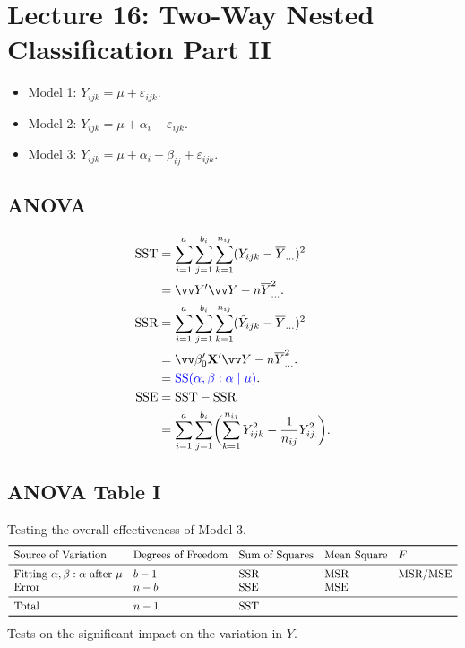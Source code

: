 \section{Lecture 16: Two-Way Nested Classification Part II}
\begin{itemize}
    \item Model 1: $ Y_{ijk}=\mu+\varepsilon_{ijk} $.
    \item Model 2: $ Y_{ijk}=\mu+\alpha_i+\varepsilon_{ijk} $.
    \item Model 3: $ Y_{ijk}=\mu+\alpha_i+\beta_{ij}+\varepsilon_{ijk} $.
\end{itemize}
\subsection*{ANOVA}
\begin{align*}
    \SST
     & =\sum_{i=1}^{a}\sum_{j=1}^{b_i}\sum_{k=1}^{n_{ij}}(Y_{ijk}-\bar{Y}_{...})^2                          \\
     & =\Vector{Y}'\Vector{Y}-n\bar{Y}_{...}^2.                                                             \\
    \SSR
     & =\sum_{i=1}^{a}\sum_{j=1}^{b_i}\sum_{k=1}^{n_{ij}}(\hat{Y}_{ijk}-\bar{Y}_{...})^2                    \\
     & =\Vector{\beta}_0'\Matrix{X}'\Vector{Y}-n\bar{Y}_{...}^2.                                            \\
     & =\textcolor{blue}{\text{SS}(\alpha,\beta:\alpha\mid \mu)}.                                           \\
    \SSE
     & =\SST-\SSR                                                                                           \\
     & =\sum_{i=1}^{a}\sum_{j=1}^{b_i}\biggl(\sum_{k=1}^{n_{ij}}Y_{ijk}^2-\frac{1}{n_{ij}}Y_{ij.}^2\biggr).
\end{align*}
\subsection*{ANOVA Table I}
Testing the overall effectiveness of Model 3.
\[ \begin{array}{lllll}
        \toprule
        \text{Source of Variation}                          & \text{Degrees of Freedom} & \text{Sum of Squares} & \text{Mean Square} & F         \\
        \midrule
        \text{Fitting }\alpha,\beta:\alpha\text{ after }\mu & b-1                       & \SSR                  & \MSR               & \MSR/\MSE \\
        \text{Error}                                        & n-b                       & \SSE                  & \MSE                           \\
        \midrule
        \text{Total}                                        & n-1                       & \SST                                                   \\
        \bottomrule
    \end{array} \]
Tests on the significant impact on the variation in $ Y $.
